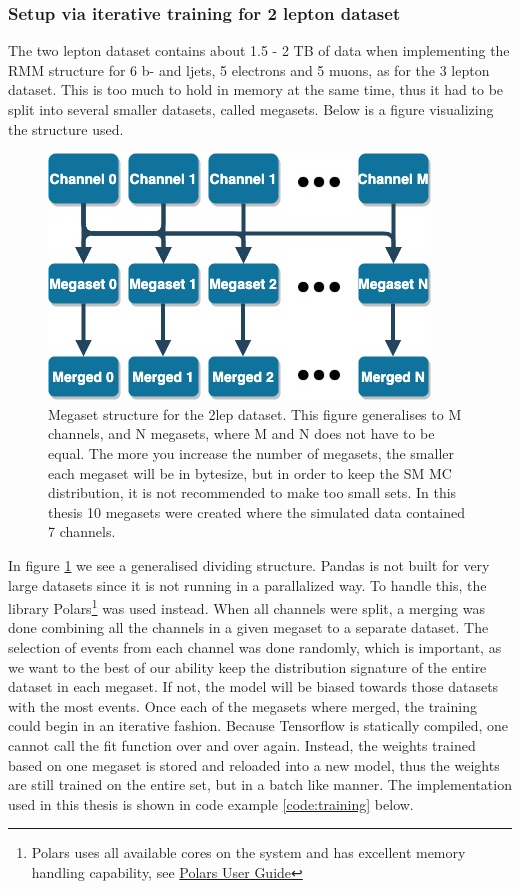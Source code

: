 \subsubsection*{Setup via iterative training for 2 lepton dataset}
The two lepton dataset contains about 1.5 - 2 TB of data when implementing the RMM structure for 6 
b- and ljets, 5 electrons and 5 muons, as for the 3 lepton dataset. This is too much to hold in memory at the same time, thus it had to 
be split into several smaller datasets, called megasets. Below is a figure visualizing the structure used. 

\begin{figure}[H]
    \centering
    \includegraphics[width=0.6\linewidth]{Figures/2lep_config/megaset_struct.jpeg}
    \caption[Megaset structure diagram]{Megaset structure for the 2lep dataset. This figure generalises to M channels, and N megasets, 
    where M and N does not have to be equal. The more you increase the number of megasets, 
    the smaller each megaset will be in bytesize, but in order to keep the SM MC distribution, it is not recommended to make too small sets. 
    In this thesis 10 megasets were created where the simulated data contained 7 channels. }
    \label{fig:2lep_struct}
\end{figure}




In figure \ref{fig:2lep_struct} we see a generalised dividing structure. Pandas is not 
built for very large datasets since it is not running in a parallalized way. To handle this, the library
Polars\footnote{Polars uses all available cores on the system and has excellent memory 
handling capability, see \href{https://pola-rs.github.io/polars-book/user-guide/}{Polars User Guide}}
\cite{ritchie_vink_2023_7744139} was used instead. When all channels were split, a merging was done combining all the channels in a given 
megaset to a separate dataset. The selection of events from each channel was done randomly, 
which is important, as we want to the best of our ability keep the distribution signature of the entire dataset in each megaset. If not, the model will 
be biased towards those datasets with the most events. Once each of the megasets where merged, the training could begin in an iterative fashion. Because
Tensorflow is statically compiled, one cannot call the fit function over and over again. Instead, the weights trained based on one megaset is stored and 
reloaded into a new model, thus the weights are still trained on the entire set, but in a batch like manner. 
The implementation used in this thesis is shown in code example \ref{code:training} below.



